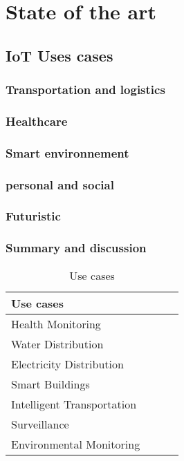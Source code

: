 
\chapter{State of the art \cite{bregell_hardware_2015}} %


\section{IoT Uses cases} %
\label{sec:section_name}

\subsection{Transportation and logistics}
\subsection{Healthcare}
\subsection{Smart environnement}
\subsection{personal and social}
\subsection{Futuristic}
\subsection{Summary and discussion}





\begin{table}[h!]
\scriptsize
	\begin{tabular}{l|l|l|l}
	\textbf{Use cases}         &  &  & \\\hline
	Health Monitoring          &  &  & \\\hline
	Water Distribution         &  &  & \\\hline
	Electricity Distribution   &  &  & \\\hline
	Smart Buildings            &  &  & \\\hline
	Intelligent Transportation &  &  & \\\hline
	Surveillance               &  &  & \\\hline
	Environmental Monitoring   &  &  & \\
	\end{tabular}
	\caption{\label{tab:IoTUseCase} Use cases \cite{hancke_role_2012}}
\end{table}


